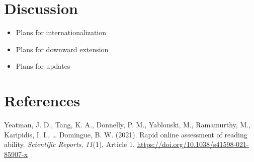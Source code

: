 \documentclass[
  english,
  man]{apa6}
\newlength{\cslhangindent}
\newenvironment{CSLReferences}[2] %
 {\begin{list}{}{%
  \setlength{\itemindent}{0pt}
  \setlength{\leftmargin}{0pt}
  \setlength{\parsep}{0pt}
  \ifodd #1
   \setlength{\leftmargin}{\cslhangindent}
   \setlength{\itemindent}{-1\cslhangindent}
  \fi
  \setlength{\itemsep}{#2\baselineskip}}}
 {\end{list}}
\providecommand{\tightlist}{%
  \setlength{\itemsep}{0pt}\setlength{\parskip}{0pt}}
\begin{document}
\section{Discussion}\label{discussion}

\begin{itemize}
\tightlist
\item
  Plans for internationalization
\item
  Plans for downward extension
\item
  Plans for updates
\end{itemize}

\newpage

\section{References}\label{references}

\protect{}\label{refs}
\begin{CSLReferences}{1}{0}
Yeatman, J. D., Tang, K. A., Donnelly, P. M., Yablonski, M., Ramamurthy, M., Karipidis, I. I., \ldots{} Domingue, B. W. (2021). Rapid online assessment of reading ability. \emph{Scientific Reports}, \emph{11}(1), Article 1. \url{https://doi.org/10.1038/s41598-021-85907-x}

\end{CSLReferences}
\end{document}
